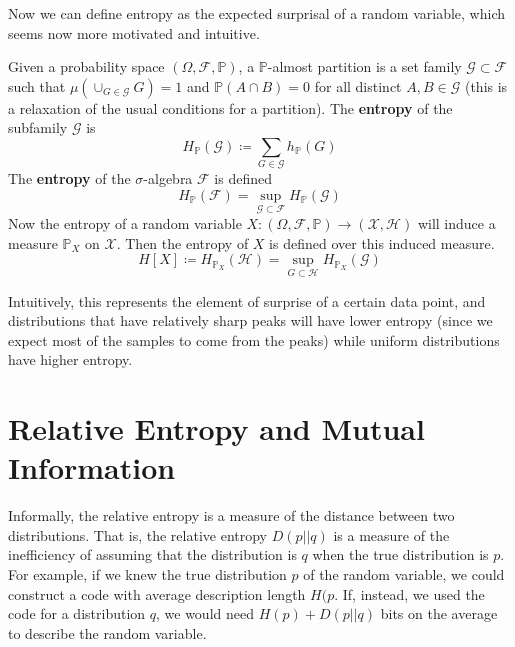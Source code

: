 \documentclass{article}
\begin{document}
    Now we can define entropy as the expected surprisal of a random variable, which seems now more motivated and intuitive. 

    \begin{definition}[Entropy]
      Given a probability space $(\Omega, \mathcal{F}, \mathbb{P})$, a $\mathbb{P}$-almost partition is a set family $\mathcal{G} \subset \mathcal{F}$ such that $\mu(\cup_{G \in \mathcal{G}} G) = 1$ and $\mathbb{P}(A \cap B) = 0$ for all distinct $A, B \in \mathcal{G}$ (this is a relaxation of the usual conditions for a partition). The \textbf{entropy} of the subfamily $\mathcal{G}$ is 
      \begin{equation}
        H_\mathbb{P} (\mathcal{G}) \coloneqq \sum_{G \in \mathcal{G}} h_\mathbb{P}(G)
      \end{equation}
      The \textbf{entropy} of the $\sigma$-algebra $\mathcal{F}$ is defined 
      \begin{equation}
        H_\mathbb{P} (\mathcal{F}) = \sup_{\mathcal{G} \subset \mathcal{F}} H_\mathbb{P} (\mathcal{G})
      \end{equation}
      Now the entropy of a random variable $X: (\Omega, \mathcal{F}, \mathbb{P}) \rightarrow (\mathcal{X}, \mathcal{H})$ will induce a measure $\mathbb{P}_X$ on $\mathcal{X}$. Then the entropy of $X$ is defined over this induced measure. 
      \begin{equation}
        H[X] \coloneqq H_{\mathbb{P}_{X}} (\mathcal{H}) = \sup_{G \subset \mathcal{H}} H_{\mathbb{P}_X} (\mathcal{G})
      \end{equation}
    \end{definition}

    Intuitively, this represents the element of surprise of a certain data point, and distributions that have relatively sharp peaks will have lower entropy (since we expect most of the samples to come from the peaks) while uniform distributions have higher entropy. 

\section{Relative Entropy and Mutual Information}

  Informally, the relative entropy is a measure of the distance between two distributions. That is, the relative entropy $D(p||q)$ is a measure of the inefficiency of assuming that the distribution is $q$ when the true distribution is $p$. For example, if we knew the true distribution $p$ of the random variable, we could construct a code with average description length $H(p$. If, instead, we used the code for a distribution $q$, we would need $H(p) + D(p||q)$ bits on the average to describe the random variable. 
\end{document}
